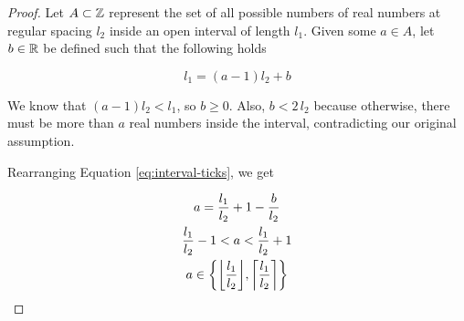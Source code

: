 \begin{proof}
	Let $A \subset \mathbb Z$ represent the set of all possible numbers of real numbers at regular spacing $l_2$ inside an open interval of length $l_1$. Given some $a \in A$, let $b \in \mathbb R$ be defined such that the following holds

	\begin{equation}\label{eq:interval-ticks}
		l_1 = (a - 1) l_2 + b
	\end{equation}

	We know that $(a - 1) l_2 < l_1$, so $b \ge 0$. Also, $b < 2 \, l_2$ because otherwise, there must be more than $a$ real numbers inside the interval, contradicting our original assumption.

	Rearranging Equation \ref{eq:interval-ticks}, we get

	\begin{gather}
		a = \frac{l_1}{l_2} + 1 - \frac{b}{l_2}\\
		\frac{l_1}{l_2} - 1 < a < \frac{l_1}{l_2} + 1\\
		a \in \cbracket{\floor{\frac{l_1}{l_2}}, \ceil{\frac{l_1}{l_2}}}
	\end{gather}
\end{proof}